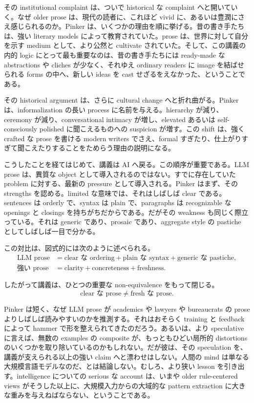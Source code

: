 その institutional complaint は、ついで historical な complaint へと開いていく。なぜ older prose は、現代の読者に、これほど vivid に、あるいは豊潤にさえ感じられるのか。Pinker は、いくつかの理由を順に挙げる。昔の書き手たちは、強い literary models によって教育されていた。prose は、世界に対して自分を示す medium として、より公然と cultivate されていた。そして、この講義の内的 logic にとって最も重要なのは、昔の書き手たちには ready-made な abstractions や cliches が少なく、それゆえ ordinary readers に image を結ばせられる forms の中へ、新しい ideas を cast せざるをえなかった、ということである。

その historical argument は、さらに cultural change へと折れ曲がる。Pinker は、informalization の長い process に名前を与える。hierarchy が減り、ceremony が減り、conversational intimacy が増し、elevated あるいは self-consciously polished に聞こえるものへの suspicion が増す。この shift は、強く crafted な prose を書ける modern writers でさえ、formal すぎたり、仕上がりすぎて聞こえたりすることをためらう理由の説明になる。

こうしたことを経てはじめて、講義は AI へ戻る。この順序が重要である。LLM prose は、異質な object として導入されるのではない。すでに存在していた problem に対する、最新の pressure として導入される。Pinker はまず、その strengths を認める。limited な意味では、それはしばしば clear である。sentences は orderly で、syntax は plain で、paragraphs は recognizable な openings と closings を持ちがちだからである。だがその weakness も同じく際立っている。それは generic であり、prosaic であり、aggregate style の pastiche としてしばしば一目で分かる。

この対比は、図式的には次のように述べられる。
\begin{align}
\text{LLM prose} &= \text{clear な ordering} + \text{plain な syntax} + \text{generic な pastiche}, \\
\text{強い prose} &= \text{clarity} + \text{concreteness} + \text{freshness}.
\end{align}

したがって講義は、ひとつの重要な non-equivalence をもって閉じる。
\begin{equation}
\text{clear な prose} \neq \text{fresh な prose}.
\end{equation}

Pinker は短く、なぜ LLM prose が academics や lawyers や bureaucrats の prose よりしばしば読みやすいのかを推測する。それはおそらく training と feedback によって hammer で形を整えられてきたのだろう。あるいは、より speculative に言えば、無数の examples の composite が、もっともひどい局所的 distortions のいくつかを取り除いているのかもしれない。だが彼は、その speculation を、講義が支えられる以上の強い claim へと漂わせはしない。人間の mind は単なる大規模言語モデルなのだ、とは結論しない。むしろ、より狭い lesson を引き出す。intelligence についての serious な account は、いまや older rule-centered views がそうした以上に、大規模入力からの大域的な pattern extraction に大きな重みを与えねばならない、ということである。

